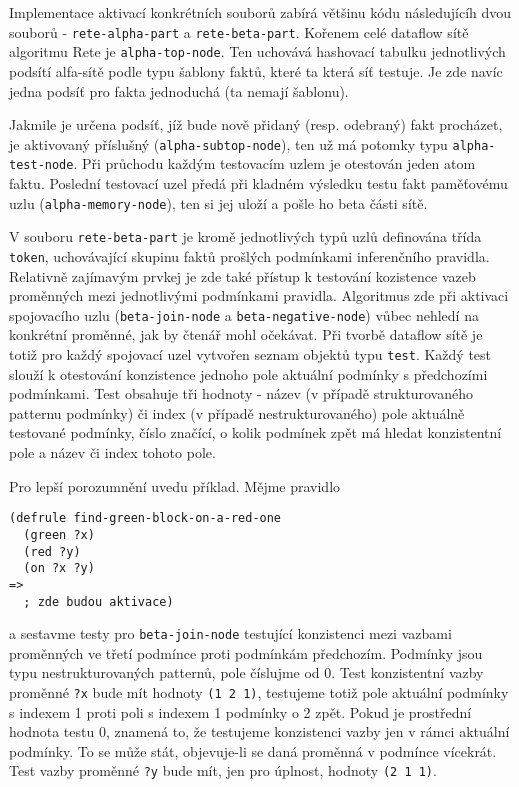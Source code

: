 Implementace aktivací konkrétních souborů zabírá většinu kódu následujícíh dvou
souborů - \verb|rete-alpha-part| a \verb|rete-beta-part|. Kořenem celé dataflow
sítě algoritmu Rete je \verb|alpha-top-node|. Ten uchovává hashovací tabulku
jednotlivých podsítí alfa-sítě podle typu šablony faktů, které ta která síť
testuje. Je zde navíc jedna podsíť pro fakta jednoduchá (ta nemají šablonu).

Jakmile je určena podsíť, jíž bude nově přidaný (resp. odebraný) fakt procházet,
je aktivovaný příslušný  (\verb|alpha-subtop-node|), ten už má
potomky typu \verb|alpha-test-node|. Při průchodu každým testovacím uzlem je
otestován jeden atom faktu. Poslední testovací uzel předá při kladném výsledku
testu fakt paměťovému uzlu (\verb|alpha-memory-node|), ten si jej uloží
a pošle ho beta části sítě.

V souboru \verb|rete-beta-part| je kromě jednotlivých typů uzlů definována třída
\verb|token|, uchovávající skupinu faktů prošlých podmínkami inferenčního 
pravidla. Relativně zajímavým prvkej je zde také přístup k testování  kozistence
vazeb proměnných mezi jednotlivými podmínkami pravidla. Algoritmus zde při
aktivaci spojovacího uzlu (\verb|beta-join-node| a \verb|beta-negative-node|)
vůbec nehledí na konkrétní proměnné, jak by čtenář mohl očekávat. Při tvorbě
dataflow sítě je totiž pro každý spojovací uzel vytvořen seznam objektů typu
\verb|test|. Každý test slouží k otestování konzistence jednoho pole aktuální
podmínky s předchozími podmínkami. Test obsahuje tři hodnoty - název (v případě
strukturovaného patternu podmínky) či index (v případě nestrukturovaného)
pole aktuálně testované podmínky, číslo značící, o kolik podmínek zpět má hledat
konzistentní pole a název či index tohoto pole.

Pro lepší porozumnění uvedu příklad. Mějme pravidlo
\begin{verbatim}
(defrule find-green-block-on-a-red-one
  (green ?x)
  (red ?y)
  (on ?x ?y)
=>
  ; zde budou aktivace)
\end{verbatim}
a sestavme testy pro \verb|beta-join-node| testující konzistenci mezi vazbami
proměnných ve třetí podmínce proti podmínkám předchozím. Podmínky jsou typu
nestrukturovaných patternů, pole číslujme od 0. Test konzistentní vazby
proměnné \verb|?x| bude mít hodnoty \verb|(1 2 1)|, testujeme totiž pole
aktuální podmínky s indexem 1 proti poli s indexem 1 podmínky o 2 zpět.
Pokud je prostřední hodnota testu 0, znamená to, že testujeme konzistenci vazby
jen v rámci aktuální podmínky. To se může stát, objevuje-li se daná proměnná
v podmínce vícekrát. Test vazby proměnné \verb|?y| bude mít, jen pro úplnost,
hodnoty \verb|(2 1 1)|.

